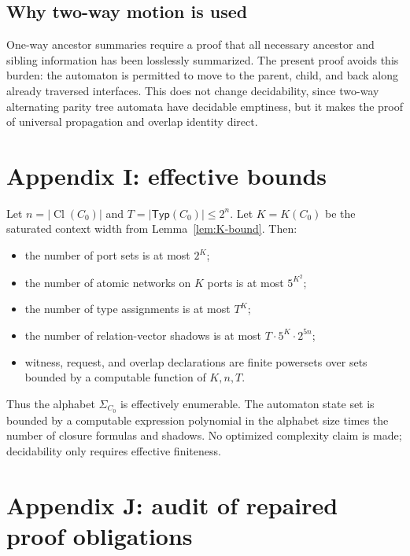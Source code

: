 \documentclass[11pt]{article}
\newcommand{\Cl}{\operatorname{Cl}}
\newcommand{\Typ}{\mathsf{Typ}}
\begin{document}
\subsection{Why two-way motion is used}

One-way ancestor summaries require a proof that all necessary ancestor and sibling information has been losslessly summarized.  The present proof avoids this burden: the automaton is permitted to move to the parent, child, and back along already traversed interfaces.  This does not change decidability, since two-way alternating parity tree automata have decidable emptiness, but it makes the proof of universal propagation and overlap identity direct.

\section{Appendix I: effective bounds}

Let $n=|\Cl(C_0)|$ and $T=|\Typ(C_0)|\le 2^n$.  Let $K=K(C_0)$ be the saturated context width from Lemma~\ref{lem:K-bound}.  Then:
\begin{itemize}
\item the number of port sets is at most $2^K$;
\item the number of atomic networks on $K$ ports is at most $5^{K^2}$;
\item the number of type assignments is at most $T^K$;
\item the number of relation-vector shadows is at most $T\cdot 5^K\cdot 2^{5n}$;
\item witness, request, and overlap declarations are finite powersets over sets bounded by a computable function of $K,n,T$.
\end{itemize}
Thus the alphabet $\Sigma_{C_0}$ is effectively enumerable.  The automaton state set is bounded by a computable expression polynomial in the alphabet size times the number of closure formulas and shadows.  No optimized complexity claim is made; decidability only requires effective finiteness.

\section{Appendix J: audit of repaired proof obligations}
\end{document}

